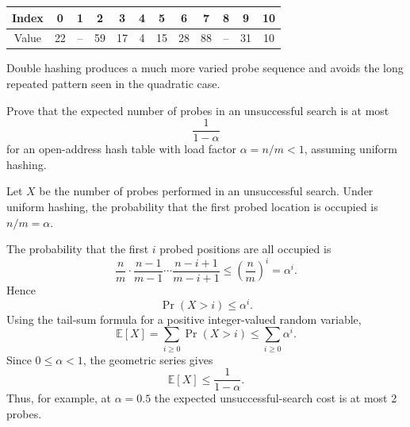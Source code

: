 \documentclass[11pt,a4paper]{article}
\begin{document}
\begin{qaanswer}[Answer 1(b)]
\begin{center}
\begin{tabular}{c|ccccccccccc}
Index &0&1&2&3&4&5&6&7&8&9&10\\\hline
Value &22&--&59&17&4&15&28&88&--&31&10
\end{tabular}
\end{center}

Double hashing produces a much more varied probe sequence and avoids the long repeated pattern seen in the quadratic case.
\end{qaanswer}

\begin{qaquestion}
Prove that the expected number of probes in an unsuccessful search is at most
\[
\frac{1}{1-\alpha}
\]
for an open-address hash table with load factor \(\alpha=n/m<1\), assuming uniform hashing.
\end{qaquestion}
\begin{qaanswer}[Answer 1(c)]
Let \(X\) be the number of probes performed in an unsuccessful search. Under uniform hashing, the probability that the first probed location is occupied is \(n/m=\alpha\).

The probability that the first \(i\) probed positions are all occupied is
\[
\frac{n}{m}\cdot\frac{n-1}{m-1}\cdots
\frac{n-i+1}{m-i+1}
\le \left(\frac{n}{m}\right)^i
=\alpha^i.
\]
Hence
\[
\Pr(X>i)\le \alpha^i.
\]
Using the tail-sum formula for a positive integer-valued random variable,
\[
\mathbb E[X]
=\sum_{i\ge0}\Pr(X>i)
\le \sum_{i\ge0}\alpha^i.
\]
Since \(0\le\alpha<1\), the geometric series gives
\[
\boxed{\mathbb E[X]\le \frac{1}{1-\alpha}}.
\]
Thus, for example, at \(\alpha=0.5\) the expected unsuccessful-search cost is at most 2 probes.
\end{qaanswer}
\end{document}
